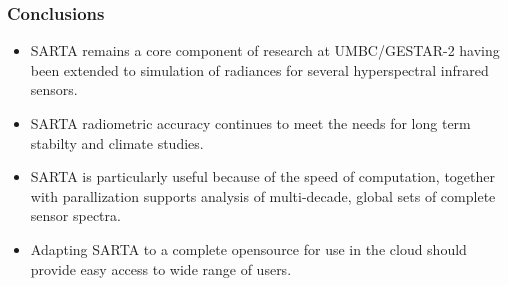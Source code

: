 \documentclass[10pt,t]{beamer}
\begin{document}
\begin{frame}
  \frametitle{Conclusions}
  \begin{itemize}
  \item SARTA remains a core component of research at UMBC/GESTAR-2 having been extended
    to simulation of radiances for several hyperspectral infrared sensors.
  \item SARTA radiometric accuracy continues to meet the needs for long term stabilty
    and climate studies.
  \item SARTA is particularly useful because of the speed of computation, together
    with parallization supports analysis of multi-decade, global sets of complete
    sensor spectra.
  \item Adapting SARTA to a complete opensource for use in the cloud should provide
    easy access to wide range of users. 

  \end{itemize}
\end{frame}

\end{document}
